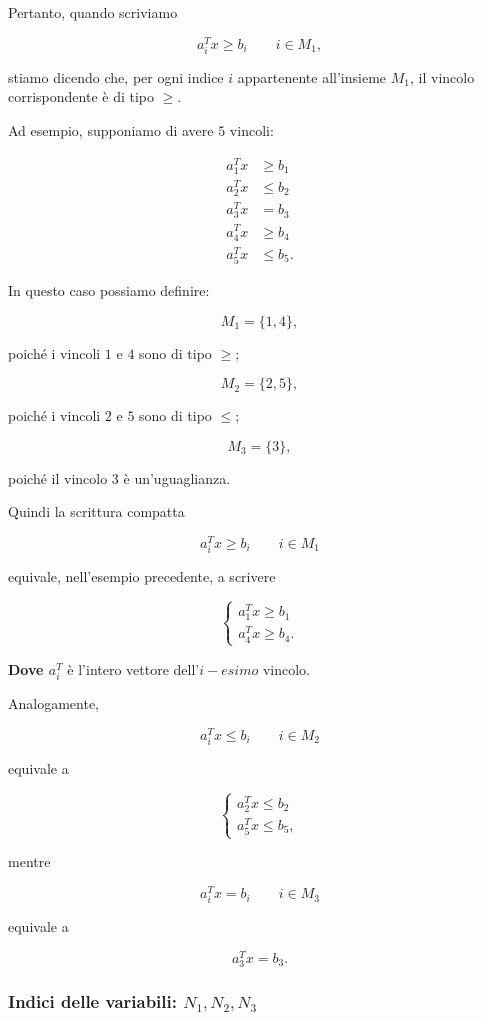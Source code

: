 Pertanto, quando scriviamo

\[
a_i^Tx\ge b_i
\qquad i\in M_1,
\]

stiamo dicendo che, per ogni indice $i$ appartenente all'insieme
$M_1$, il vincolo corrispondente è di tipo $\ge$.

Ad esempio, supponiamo di avere $5$ vincoli:

\[
\begin{aligned}
a_1^Tx &\ge b_1\\
a_2^Tx &\le b_2\\
a_3^Tx &= b_3\\
a_4^Tx &\ge b_4\\
a_5^Tx &\le b_5.
\end{aligned}
\]

In questo caso possiamo definire:

\[
M_1=\{1,4\},
\]

poiché i vincoli $1$ e $4$ sono di tipo $\ge$;

\[
M_2=\{2,5\},
\]

poiché i vincoli $2$ e $5$ sono di tipo $\le$;

\[
M_3=\{3\},
\]

poiché il vincolo $3$ è un'uguaglianza.

Quindi la scrittura compatta

\[
a_i^Tx\ge b_i
\qquad i\in M_1
\]

equivale, nell'esempio precedente, a scrivere

\[
\begin{cases}
a_1^Tx\ge b_1\\
a_4^Tx\ge b_4.
\end{cases}
\]

\textbf{Dove $a_i^T$} è l'intero vettore dell'$i-esimo$ vincolo.

Analogamente,

\[
a_i^Tx\le b_i
\qquad i\in M_2
\]

equivale a

\[
\begin{cases}
a_2^Tx\le b_2\\
a_5^Tx\le b_5,
\end{cases}
\]

mentre

\[
a_i^Tx=b_i
\qquad i\in M_3
\]

equivale a

\[
a_3^Tx=b_3.
\]

\subsubsection*{Indici delle variabili: $N_1,N_2,N_3$}

